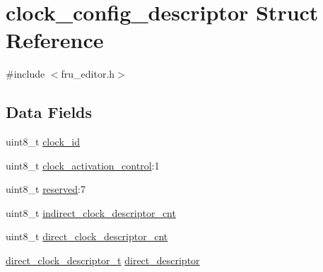 \hypertarget{structclock__config__descriptor}{\section{clock\-\_\-config\-\_\-descriptor Struct Reference}
\label{structclock__config__descriptor}
}


{\ttfamily \#include $<$fru\-\_\-editor.\-h$>$}

\subsection*{Data Fields}
\begin{DoxyCompactItemize}
\item 
uint8\-\_\-t \hyperlink{structclock__config__descriptor_a402e26f6055da21627587428161f6044}{clock\-\_\-id}
\item 
uint8\-\_\-t \hyperlink{structclock__config__descriptor_a9e25d79f0e79cc66db13fe6dd35f3958}{clock\-\_\-activation\-\_\-control}\-:1
\item 
uint8\-\_\-t \hyperlink{structclock__config__descriptor_aa8a081f5969c1c406cf7d9bfab47b258}{reserved}\-:7
\item 
uint8\-\_\-t \hyperlink{structclock__config__descriptor_ab9ef769de545cb0c80c7a516ede75798}{indirect\-\_\-clock\-\_\-descriptor\-\_\-cnt}
\item 
uint8\-\_\-t \hyperlink{structclock__config__descriptor_a10b0a229bf73eb240b3d5f2dff14052f}{direct\-\_\-clock\-\_\-descriptor\-\_\-cnt}
\item 
\hyperlink{fru__editor_8h_a35f4f600d8bb59413879dbfe09ecb69e}{direct\-\_\-clock\-\_\-descriptor\-\_\-t} \hyperlink{structclock__config__descriptor_af1608bab5f4007077825759bd03fa216}{direct\-\_\-descriptor}
\end{DoxyCompactItemize}


